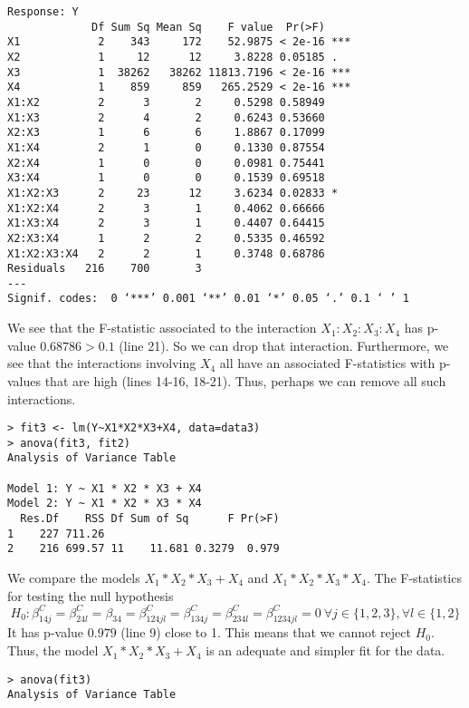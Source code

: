 \documentclass[10pt]{article}
\begin{document}
\begin{enumerate}
\begin{enumerate}[a)]
\begin{lstlisting}
Response: Y
             Df Sum Sq Mean Sq    F value  Pr(>F)    
X1            2    343     172    52.9875 < 2e-16 ***
X2            1     12      12     3.8228 0.05185 .  
X3            1  38262   38262 11813.7196 < 2e-16 ***
X4            1    859     859   265.2529 < 2e-16 ***
X1:X2         2      3       2     0.5298 0.58949    
X1:X3         2      4       2     0.6243 0.53660    
X2:X3         1      6       6     1.8867 0.17099    
X1:X4         2      1       0     0.1330 0.87554    
X2:X4         1      0       0     0.0981 0.75441    
X3:X4         1      0       0     0.1539 0.69518    
X1:X2:X3      2     23      12     3.6234 0.02833 *  
X1:X2:X4      2      3       1     0.4062 0.66666    
X1:X3:X4      2      3       1     0.4407 0.64415    
X2:X3:X4      1      2       2     0.5335 0.46592    
X1:X2:X3:X4   2      2       1     0.3748 0.68786    
Residuals   216    700       3                       
---
Signif. codes:  0 ‘***’ 0.001 ‘**’ 0.01 ‘*’ 0.05 ‘.’ 0.1 ‘ ’ 1
		\end{lstlisting}
		
		We see that the F-statistic associated to the interaction $X_1:X_2:X_3:X_4$ has p-value $0.68786 > 0.1$ (line 21). So we can drop that interaction. Furthermore, we see that the interactions involving $X_4$ all have an associated F-statistics with p-values that are high (lines 14-16, 18-21). Thus, perhaps we can remove all such interactions.  
		
		\begin{lstlisting}
> fit3 <- lm(Y~X1*X2*X3+X4, data=data3)
> anova(fit3, fit2)
Analysis of Variance Table

Model 1: Y ~ X1 * X2 * X3 + X4
Model 2: Y ~ X1 * X2 * X3 * X4
  Res.Df    RSS Df Sum of Sq      F Pr(>F)
1    227 711.26                           
2    216 699.57 11    11.681 0.3279  0.979
		\end{lstlisting}
		
		We compare the models $X_1 * X_2 * X_3 + X_4$ and $X_1 * X_2 * X_3 * X_4$. The F-statistics for testing the null hypothesis 
		\begin{displaymath}
			H_0: \beta_{14j}^C = \beta_{24l}^C = \beta_{34} = \beta_{124jl}^C = \beta_{134j}^C = \beta_{234l}^C = \beta_{1234jl}^C = 0 \  \forall j \in \{1,2,3\}, \forall l \in \{1,2\}
		\end{displaymath}
		It has p-value $0.979$ (line 9) close to 1. This means that we cannot reject $H_0$. Thus, the model $X_1 * X_2 * X_3 + X_4$ is an adequate and simpler fit for the data.
		\begin{lstlisting}
> anova(fit3)
Analysis of Variance Table


\end{lstlisting}
\end{enumerate}
\end{enumerate}
\end{document}
